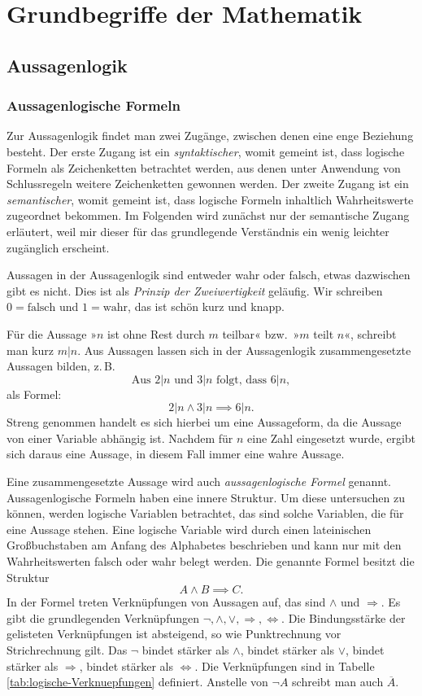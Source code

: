 
\chapter{Grundbegriffe der Mathematik}

\section{Aussagenlogik}

\subsection{Aussagenlogische Formeln}

Zur Aussagenlogik findet man zwei Zugänge, zwischen denen eine enge
Beziehung besteht. Der erste Zugang ist ein \emph{syntaktischer},
womit gemeint ist, dass logische Formeln als Zeichenketten
betrachtet werden, aus denen unter Anwendung von Schlussregeln weitere
Zeichenketten gewonnen werden. Der zweite Zugang ist ein
\emph{semantischer}, womit gemeint ist, dass logische Formeln
inhaltlich Wahrheitswerte zugeordnet bekommen. Im Folgenden wird
zunächst nur der semantische Zugang erläutert, weil mir dieser für das
grundlegende Verständnis ein wenig leichter zugänglich erscheint.

Aussagen in der Aussagenlogik sind entweder wahr oder falsch,
etwas dazwischen gibt es nicht. Dies ist als \emph{Prinzip
der Zweiwertigkeit} geläufig.
Wir schreiben $0=\text{falsch}$ und $1=\text{wahr}$, das ist schön
kurz und knapp.

Für die Aussage »$n$ ist ohne Rest durch $m$ teilbar«
bzw.\ »$m$ teilt $n$«, schreibt man kurz $m|n$. Aus Aussagen lassen
sich in der Aussagenlogik zusammengesetzte Aussagen bilden, z.\,B.%
\[\text{Aus $2|n$ und $3|n$ folgt, dass $6|n$},\]
als Formel:
\[2|n\land 3|n \implies 6|n.\]
Streng genommen handelt es sich hierbei um eine Aussageform, da die
Aussage von einer Variable abhängig ist. Nachdem für $n$ eine Zahl
eingesetzt wurde, ergibt sich daraus eine Aussage, in diesem Fall
immer eine wahre Aussage.

Eine zusammengesetzte Aussage wird auch \emph{aussagenlogische Formel}
genannt. Aussagenlogische Formeln haben eine innere Struktur. Um diese
untersuchen zu können, werden logische Variablen betrachtet,
das sind solche Variablen, die für eine Aussage stehen. Eine
logische Variable wird durch einen lateinischen Großbuchstaben
am Anfang des Alphabetes beschrieben und kann nur mit den
Wahrheitswerten falsch oder wahr belegt werden. Die genannte Formel
besitzt die Struktur
\[A\land B \implies C.\]
In der Formel treten Verknüpfungen von Aussagen auf, das sind
$\land$ und $\Rightarrow$. Es gibt die grundlegenden Verknüpfungen
$\neg,\land,\lor,\Rightarrow,\Leftrightarrow$. Die Bindungsstärke
der gelisteten Verknüpfungen ist absteigend, so wie Punktrechnung
vor Strichrechnung gilt. Das $\neg$ bindet stärker als $\land$,
bindet stärker als $\lor$, bindet stärker als $\Rightarrow$,
bindet stärker als $\Leftrightarrow$. Die Verknüpfungen sind
in Tabelle \ref{tab:logische-Verknuepfungen} definiert.
Anstelle von $\neg A$ schreibt man auch $\overline A$.

